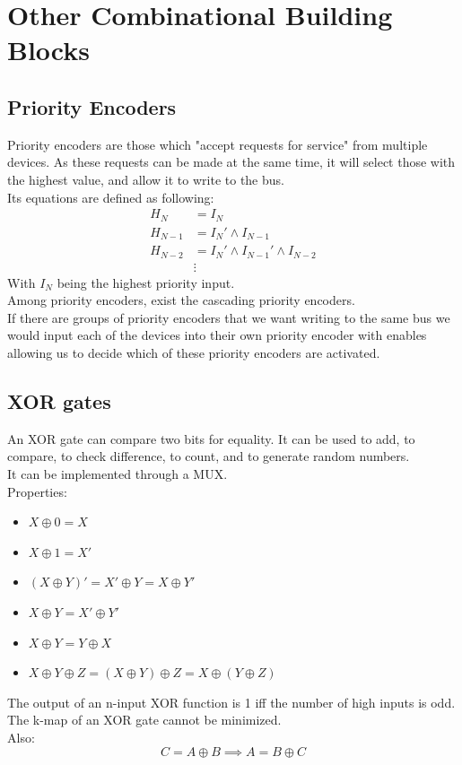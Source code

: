 \documentclass[nobib]{tufte-handout}
\begin{document}
    \section{Other Combinational Building Blocks}
    \subsection{Priority Encoders}
    Priority encoders are those which "accept requests for service" from multiple
    devices. As these requests can be made at the same time, it will select those
    with the highest value, and allow it to write to the bus.\\ Its equations are
    defined as following:
    \begin{align*}
        H_N     & =I_N                               \\
        H_{N-1} & =I_N' \land I_{N-1}                \\
        H_{N-2} & =I_N' \land I_{N-1}' \land I_{N-2} \\
                & \vdots
    \end{align*}
    With $I_N$ being the highest priority input.\\
    Among priority encoders, exist the cascading priority encoders.\\
    If there are groups of priority encoders that we want writing to the same bus we would input each of the devices into their own priority encoder with enables allowing us to decide which of these priority encoders are activated.
    \subsection{XOR gates}
    An XOR gate can compare two bits for equality. It can be used to add, to
    compare, to check difference, to count, and to generate random numbers.\\ It
    can be implemented through a MUX.\\ Properties:\\
    \begin{itemize}
        \item $X\oplus 0 = X$
        \item $X\oplus 1 = X'$
        \item $(X\oplus Y)' = X'\oplus Y = X\oplus Y'$
        \item $X\oplus Y = X' \oplus Y'$
        \item $X \oplus Y = Y\oplus X$
        \item $X \oplus Y \oplus Z = (X\oplus Y) \oplus Z = X\oplus(Y\oplus Z)$
    \end{itemize}
    The output of an n-input XOR function is 1 iff the number of high inputs is odd.\\
    The k-map of an XOR gate cannot be minimized.\\
    Also:
    \begin{equation*}
        C=A \oplus B \implies A = B\oplus C
    \end{equation*}
\end{document}
